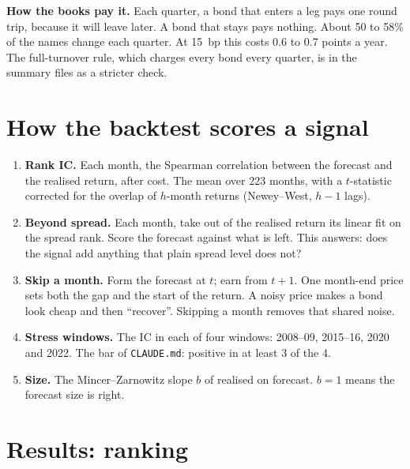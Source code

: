 \documentclass[11pt,a4paper]{article}
\newcommand{\code}[1]{\texttt{\small #1}}
\begin{document}
\textbf{How the books pay it.} Each quarter, a bond that enters a leg pays one round trip, because it will leave later. A bond that stays pays nothing. About 50 to 58\% of the names change each quarter. At 15~bp this costs 0.6 to 0.7 points a year. The full-turnover rule, which charges every bond every quarter, is in the summary files as a stricter check.

\section{How the backtest scores a signal}
\begin{enumerate}
\item \textbf{Rank IC.} Each month, the Spearman correlation between the forecast and the realised return, after cost. The mean over 223 months, with a $t$-statistic corrected for the overlap of $h$-month returns (Newey--West, $h-1$ lags).
\item \textbf{Beyond spread.} Each month, take out of the realised return its linear fit on the spread rank. Score the forecast against what is left. This answers: does the signal add anything that plain spread level does not?
\item \textbf{Skip a month.} Form the forecast at $t$; earn from $t+1$. One month-end price sets both the gap and the start of the return. A noisy price makes a bond look cheap and then ``recover''. Skipping a month removes that shared noise.
\item \textbf{Stress windows.} The IC in each of four windows: 2008--09, 2015--16, 2020 and 2022. The bar of \code{CLAUDE.md}: positive in at least 3 of the 4.
\item \textbf{Size.} The Mincer--Zarnowitz slope $b$ of realised on forecast. $b = 1$ means the forecast size is right.
\end{enumerate}

\section{Results: ranking}
\begin{table}[H]\centering\small
\PeerIcTable
\caption{Rank IC after 15~bp of cost, distressed bonds out. ``Skip a month'' shows the IC and, in brackets, the stress windows with a positive IC. ``Beyond spread, skip'' shows the IC after spread level is taken out, with a month skipped. At 12 months the cache holds no old-line forecast.}
\end{table}
\end{document}

